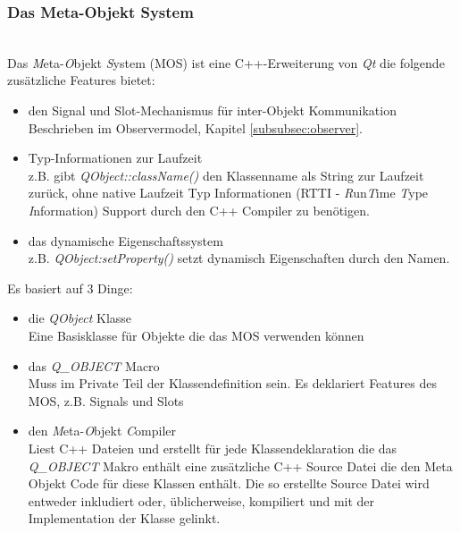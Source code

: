 \subsubsection{Das Meta-Objekt System}\mbox{}\\
Das \textit{M}eta-\textit{O}bjekt \textit{S}ystem (MOS) ist eine C++-Erweiterung von \textit{Qt} die folgende zusätzliche Features bietet:
\begin{itemize}
	\item den Signal und Slot-Mechanismus für inter-Objekt Kommunikation\\[\baselineskip]
Beschrieben im Observermodel, Kapitel \ref{subsubsec:observer}.
	\item Typ-Informationen zur Laufzeit\\[\baselineskip]
z.B. gibt \textit{QObject::className()} den Klassenname als String zur Laufzeit zurück, ohne native Laufzeit Typ Informationen (RTTI - \textit{R}un\textit{T}ime \textit{T}ype \textit{I}nformation) Support durch den C++ Compiler zu benötigen.
	\item das dynamische Eigenschaftssystem\\[\baselineskip]
z.B. \textit{QObject:setProperty()} setzt dynamisch Eigenschaften durch den Namen.
\end{itemize}
Es basiert auf 3 Dinge\cite{QT_MOC}:
\begin{itemize}
	\item die \textit{QObject} Klasse\\[\baselineskip]
Eine Basisklasse für Objekte die das MOS verwenden können
	\item das \textit{Q\_OBJECT} Macro\\[\baselineskip]
Muss im Private Teil der Klassendefinition sein. Es deklariert Features des MOS, z.B. Signals und Slots
	\item den \textit{M}eta-\textit{O}bjekt \textit{C}ompiler\\[\baselineskip]
Liest C++ Dateien und erstellt für jede Klassendeklaration die das \textit{Q\_OBJECT} Makro enthält eine zusätzliche C++ Source Datei die den Meta
Objekt Code für diese Klassen enthält. Die so erstellte Source Datei wird entweder inkludiert oder, üblicherweise, kompiliert und mit der
Implementation der Klasse gelinkt.
\end{itemize}

\newpage
